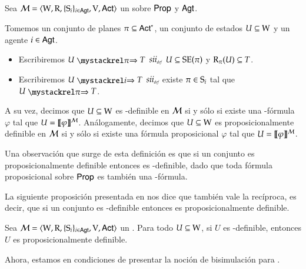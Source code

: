\begin{definicion}
    Sea $\model=\tup{\W,\R,\cset{\S_i}_{i \in \AGT},\V,\ACT}$ un \ults sobre $\PROP$ y $\AGT$.

    Tomemos un conjunto de planes $\pi \subseteq \ACT^*$, un conjunto de estados $U \subseteq \W$ y un agente $i \in \AGT$.
    \begin{itemize}
        \item Escribiremos $U \ultsExecStrat{\pi} T$ $\iffdef$ $U \subseteq \sexec(\pi)$ y $\R_\pi(U) \subseteq T$.
        \item Escribiremos $U \ultsExecAgi T$ $\iffdef$ existe $\pi \in \S_i$ tal que $U \ultsExecStrat{\pi} T$.
    \end{itemize}
    A su vez, decimos que $U \subseteq \W$ es \KHilogic-definible en $\modults$ si y sólo si existe una \KHilogic-fórmula $\varphi$ tal que
    $U = \truthset{\modults}{\varphi}$. Análogamente, decimos que $U \subseteq \W$ es proposicionalmente definible en $\modults$ 
    si y sólo si existe una fórmula proposicional $\varphi$ tal que $U = \truthset{\modults}{\varphi}$.
\end{definicion}

Una observación que surge de esta definición es que si un conjunto es proposicionalmente definible entonces es \KHilogic-definible, dado que 
toda fórmula proposicional sobre $\PROP$ es también una \KHilogic-fórmula.

La siguiente proposición presentada en \cite{ArecesFSV25,SaraviaPHD} nos dice que también vale la recíproca, 
es decir, que si un conjunto es \KHilogic-definible entonces es proposicionalmente definible.

\begin{proposicion}\label{prop:khi-implies-prop-definable}
    Sea $\model=\tup{\W,\R,\cset{\S_i}_{i \in \AGT},\V,\ACT}$ un \ults. Para todo $U \subseteq \W$, si $U$ es \KHilogic-definible, entonces $U$ es proposicionalmente definible.
\end{proposicion}

Ahora, estamos en condiciones de presentar la noción de bisimulación para \KHilogic.

